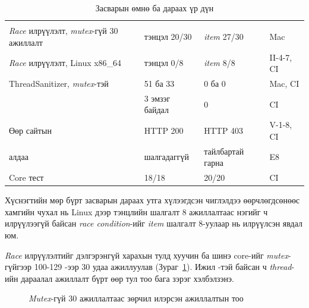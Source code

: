 \documentclass[12pt,a4paper]{article}
\newcommand{\term}[1]{\textit{#1}} %
\begin{document}
{\small\begin{longtable}{|L{0.33\textwidth}|L{0.24\textwidth}|L{0.25\textwidth}|L{0.18\textwidth}|}
\caption{Засварын өмнө ба дараах үр дүн}\label{tab:before}\\\hline
{} &  &  &  \\\hline\endfirsthead
\hline{} &  &  &  \\\hline\endhead
\term{Race} илрүүлэлт, \term{mutex}-гүй 30 ажиллалт & тэнцэл 20/30 & \term{item} 27/30 & Mac \\\hline
\term{Race} илрүүлэлт, Linux x86\_64 & тэнцэл 0/8 & \term{item} 8/8 & II-4-7, CI \\\hline
ThreadSanitizer, \term{mutex}-тэй & 51 ба 33 & 0 ба 0 & Mac, CI \\\hline
{} & 3 эмзэг байдал & 0 & CI \\\hline
Өөр сайтын  & HTTP 200 & HTTP 403 & V-1-8, CI \\\hline
{} алдаа & шалгадаггүй & тайлбартай гарна & E8 \\\hline
Core тест & 18/18 & 20/20 & CI \\\hline
\end{longtable}}

Хүснэгтийн мөр бүрт засварын дараах утга хүлээгдсэн чиглэлдээ өөрчлөгдсөнөөс хамгийн чухал нь Linux дээр тэнцлийн шалгалт 8 ажиллалтаас нэгийг ч илрүүлээгүй байсан \term{race condition}-ийг \term{item} шалгалт 8-уулаар нь илрүүлсэн явдал юм.

\term{Race} илрүүлэлтийг дэлгэрэнгүй харахын тулд хуучин ба шинэ core-ийг \term{mutex}-гүйгээр 100-129 -ээр 30 удаа ажиллуулав (Зураг~\ref{fig:race}). Ижил -тэй байсан ч \term{thread}-ийн дараалал ажиллалт бүрт өөр тул тоо бага зэрэг хэлбэлзэнэ.

\begin{figure}[H]\centering
{}
\caption{\term{Mutex}-гүй 30 ажиллалтаас зөрчил илэрсэн ажиллалтын тоо}\label{fig:race}
\end{figure}
\end{document}
